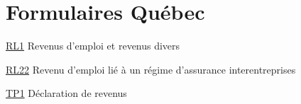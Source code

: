 \chapter*{Formulaires Québec}

\href{https://www.revenuquebec.ca/fr/services-en-ligne/formulaires-et-publications/details-courant/rl-1/}{RL1}
Revenus d'emploi et revenus divers

\href{https://www.revenuquebec.ca/fr/services-en-ligne/formulaires-et-publications/details-courant/rl-22/}{RL22}
Revenu d'emploi lié à un régime d'assurance interentreprises

\href{https://www.revenuquebec.ca/fr/services-en-ligne/formulaires-et-publications/details-courant/tp-1/}{TP1}
Déclaration de revenus
